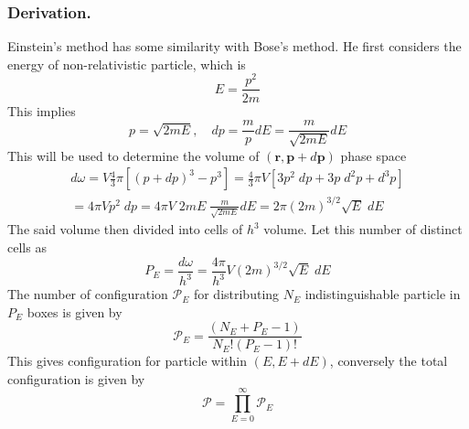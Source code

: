 \documentclass[../../../Main.tex]{subfiles}
\begin{document}
\subsubsection*{Derivation.} Einstein's method has some similarity with Bose's method. He first considers the energy of non-relativistic particle, which is 
\begin{equation*}
    E=\frac{p^2}{2m}
\end{equation*}
This implies
\begin{equation*}
    p=\sqrt{2mE},\quad dp=\frac{m}{p}dE=\frac{m}{\sqrt{2mE}}dE
\end{equation*}
This will be used to determine the volume of $(\mathbf{r},\mathbf{p}+ d\mathbf{p})$ phase space
\begin{multline*}
    d\omega=V \frac{4}{3}\pi\left[(p+dp)^3-p^3\right] = \frac{4}{3}\pi V\left[3p^2\;dp+3p\;d^2p+d^3p\right]\\
    =4\pi Vp^2\;dp =4\pi V \;2mE\;\frac{m}{\sqrt{2mE}}dE=2\pi(2m)^{3/2}\sqrt{E}\;dE
\end{multline*} 
The said volume then divided into cells of $h^3$ volume. Let this number of distinct cells as 
\begin{equation*}
    P_E=\frac{d\omega}{h^3}=\frac{4\pi}{h^3}V(2m)^{3/2}\sqrt{E}\;dE
\end{equation*}
The number of configuration $\mathcal{P}_E$ for distributing $N_E$ indistinguishable particle in $P_E$ boxes is given by 
\begin{equation*}
    \mathcal{P}_E=\frac{(N_E+P_E-1)}{N_E! (P_E-1)!}
\end{equation*}
This gives configuration for particle within $(E,E+dE)$, conversely the total configuration is given by 
\begin{equation*}
    \mathcal{P}=\prod_{E=0}^{\infty}\mathcal{P}_E
\end{equation*}
\end{document}

